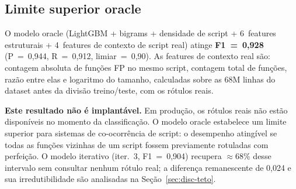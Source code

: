 \subsection{Limite superior oracle}
\label{sec:oracle}

O modelo oracle (LightGBM + bigrams + densidade de script + 6~features estruturais
+ 4~features de contexto de script real) atinge \textbf{F1~=~0,928} (P~=~0,944, R~=~0,912,
limiar~=~0,90). As features de contexto real são: contagem absoluta de funções FP
no mesmo script, contagem total de funções, razão entre elas e logaritmo do
tamanho, calculadas sobre as 68M linhas do dataset antes da divisão
treino/teste, com os rótulos reais.

\textbf{Este resultado não é implantável.} Em produção, os rótulos reais não estão
disponíveis no momento da classificação. O modelo oracle estabelece um
limite superior para sistemas de co-ocorrência de script: o desempenho
atingível se todas as funções vizinhas de um script fossem previamente rotuladas
com perfeição. O modelo iterativo (iter.~3, F1~=~0,904) recupera $\approx$68\%
desse intervalo sem consultar nenhum rótulo real; a diferença remanescente de 0,024
e sua irredutibilidade são analisadas na Seção~\ref{sec:disc-teto}.
